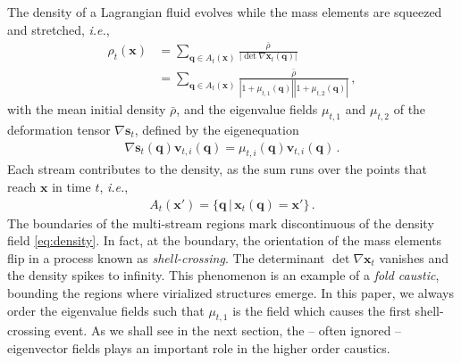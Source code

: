 \documentclass[a4paper, 11pt]{article}
\begin{document}
The density of a Lagrangian fluid evolves while the mass elements are squeezed and stretched, \textit{i.e.},
\begin{align}
\rho_t(\bm{x})
&= \sum_{\bm{q} \in A_t(\bm{x})} \frac{\bar{\rho}}{|\det \nabla \bm{x}_t(\bm{q})|}\nonumber\\
&= \sum_{\bm{q} \in A_t(\bm{x})} \frac{\bar{\rho}}{|1+\mu_{t,1}(\bm{q})||1+\mu_{t,2}(\bm{q})|}\,,
\label{eq:density}
\end{align}
with the mean initial density $\bar{\rho}$, and the eigenvalue fields $\mu_{t,1}$ and $\mu_{t,2}$ of the deformation tensor $\nabla \bm{s}_t$, defined by the eigenequation
\begin{align}
\nabla \bm{s}_t(\bm{q}) \bm{v}_{t,i}(\bm{q}) = \mu_{t,i}(\bm{q}) \bm{v}_{t,i}(\bm{q})\,.
\label{eq:EigenvalueAndEigenvector}
\end{align} 
Each stream contributes to the density, as the sum runs over the points that reach $\bm{x}$ in time $t$, \textit{i.e.},
\begin{align}
A_t(\bm{x}') = \{\bm{q}\,|\,\bm{x}_t(\bm{q})=\bm{x}'\}\,.
\end{align}
The boundaries of the multi-stream regions mark discontinuous of the density field \eqref{eq:density}. In fact, at the boundary, the orientation of the mass elements flip in a process known as \textit{shell-crossing}. The determinant $\det \nabla \bm{x}_t$ vanishes and the density spikes to infinity. This phenomenon is an example of a \textit{fold caustic}, bounding the regions where virialized structures emerge. In this paper, we always order the eigenvalue fields such that $\mu_{t,1}$ is the field which causes the first shell-crossing event. As we shall see in the next section, the -- often ignored -- eigenvector fields plays an important role in the higher order caustics.
\end{document}
